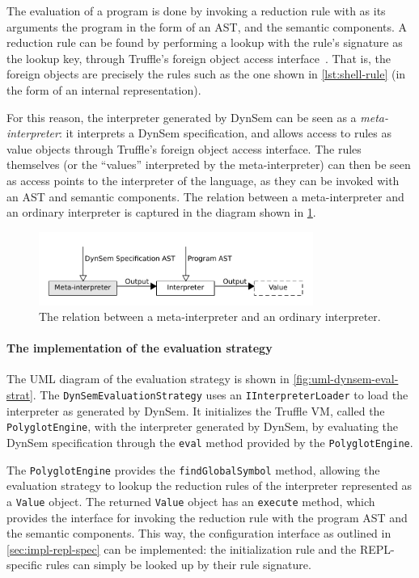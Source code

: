 The evaluation of a program is done by invoking a reduction rule with as its
arguments the program in the form of an AST, and the semantic components. A
reduction rule can be found by performing a lookup with the rule's signature as
the lookup key, through Truffle's foreign object access
interface~\cite{Grimmer15}. That is, the foreign objects are precisely the rules
such as the one shown in \cref{lst:shell-rule} (in the form of an internal
representation).

For this reason, the interpreter generated by DynSem can be seen as a
\textit{meta-interpreter}: it interprets a DynSem specification, and allows
access to rules as value objects through Truffle's foreign object access
interface. The rules themselves (or the ``values'' interpreted by the
meta-interpreter) can then be seen as access points to the interpreter of the
language, as they can be invoked with an AST and semantic components. The
relation between a meta-interpreter and an ordinary interpreter is captured in
the diagram shown in \cref{fig:meta-interpreter}.

\begin{figure}[b]
  \centering
  \includegraphics[width=0.8\textwidth]{meta-interpreter}
  \caption{The relation between a meta-interpreter and an ordinary interpreter.}
  \label{fig:meta-interpreter}
\end{figure}

\paragraph{The implementation of the evaluation strategy} The UML diagram of the
evaluation strategy is shown in \cref{fig:uml-dynsem-eval-strat}. The
\texttt{DynSemEvaluationStrategy} uses an \texttt{IInterpreterLoader} to
load the interpreter as generated by DynSem. It initializes the Truffle VM,
called the \texttt{PolyglotEngine}, with the interpreter generated by
DynSem, by evaluating the DynSem specification through the \texttt{eval} method
provided by the \texttt{PolyglotEngine}.

The \texttt{PolyglotEngine} provides the \texttt{findGlobalSymbol}
method, allowing the evaluation strategy to lookup the reduction rules of the
interpreter represented as a \texttt{Value} object. The returned
\texttt{Value} object has an \texttt{execute} method, which provides the
interface for invoking the reduction rule with the program AST and the semantic
components. This way, the configuration interface as outlined in
\cref{sec:impl-repl-spec} can be implemented: the initialization rule and the
REPL-specific rules can simply be looked up by their rule signature.

